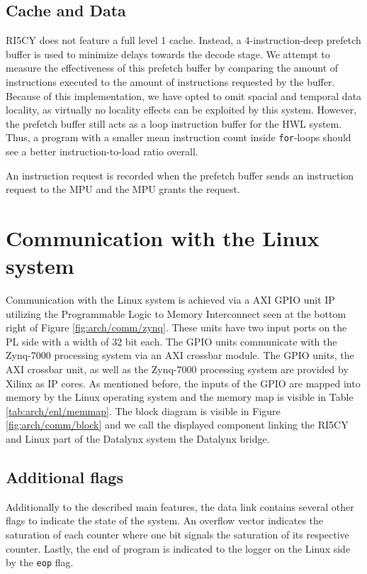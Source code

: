 \documentclass[../bachelor_paper.tex]{subfiles}
\begin{document}
\subsection{Cache and Data}
RI5CY does not feature a full level 1 cache. Instead, a 4-instruction-deep prefetch buffer is used to minimize delays towards the decode stage. We attempt to measure the effectiveness of this prefetch buffer by comparing the amount of instructions executed to the amount of instructions requested by the buffer. Because of this implementation, we have opted to omit spacial and temporal data locality, as virtually no locality effects can be exploited by this system. However, the prefetch buffer still acts as a loop instruction buffer for the \ac{HWL} system. Thus, a program with a smaller mean instruction count inside \texttt{for}-loops should see a better instruction-to-load ratio overall.

An instruction request is recorded when the prefetch buffer sends an instruction request to the \ac{MPU} and the \ac{MPU} grants the request.

\section{Communication with the Linux system}
Communication with the Linux system is achieved via a AXI GPIO unit \ac{IP} utilizing the Programmable Logic to Memory Interconnect seen at the bottom right of Figure \ref{fig:arch/comm/zynq}. These units have two input ports on the \ac{PL} side with a width of 32 bit each. The GPIO units communicate with the Zynq-7000 processing system via an AXI crossbar module. The GPIO units, the AXI crossbar unit, as well as the Zynq-7000 processing system are provided by Xilinx as \ac{IP} cores. As mentioned before, the inputs of the GPIO are mapped into memory by the Linux operating system and the memory map is visible in Table \ref{tab:arch/enl/memmap}. The block diagram is visible in Figure \ref{fig:arch/comm/block} and we call the displayed component linking the RI5CY and Linux part of the Datalynx system the Datalynx bridge.

\subsection{Additional flags}
Additionally to the described main features, the data link contains several other flags to indicate the state of the system. An overflow vector indicates the saturation of each counter where one bit signals the saturation of its respective counter. Lastly, the end of program is indicated to the logger on the Linux side by the \texttt{eop} flag.
\end{document}
